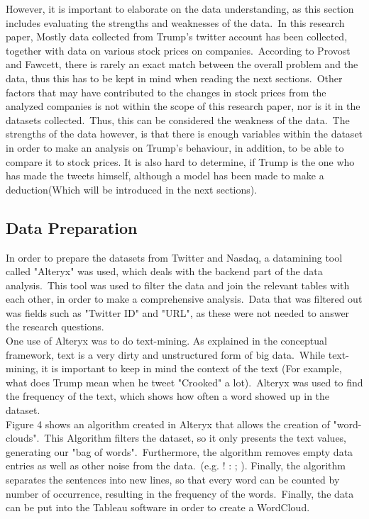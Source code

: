 \documentclass[12pt]{article}
\begin{document}
However, it is important to elaborate on the data understanding, as this section includes evaluating the strengths and weaknesses of the data.\ In this research paper, Mostly data collected from Trump's twitter account has been collected, together with data on various stock prices on companies.\  According to Provost and Fawcett, there is rarely an exact match between the overall problem and the data, thus this has to be kept in mind when reading the next sections.\ Other factors that may have contributed to the changes in stock prices from the analyzed companies is not within the scope of this research paper, nor is it in the datasets collected.\ Thus, this can be considered the weakness of the data.\ The strengths of the data however, is that there is enough variables within the dataset in order to make an analysis on Trump's behaviour, in addition, to be able to compare it to stock prices. It is also hard to determine, if Trump is the one who has made the tweets himself, although a model has been made to make a deduction(Which will be introduced in the next sections).

\subsection{Data Preparation}
In order to prepare the datasets from Twitter and Nasdaq, a datamining tool called "Alteryx" was used, which deals with the backend part of the data analysis.\ This tool was used to filter the data and join the relevant tables with each other, in order to make a comprehensive analysis.\ Data that was filtered out was fields such as "Twitter ID" and "URL", as these were not needed to answer the research questions.\ \\

One use of Alteryx was to do text-mining. As explained in the conceptual framework, text is a very dirty and unstructured form of big data.\ While text-mining, it is important to keep in mind the context of the text (For example, what does Trump mean when he tweet "Crooked" a lot).\ Alteryx was used to find the frequency of the text, which shows how often a word showed up in the dataset.  \\

Figure 4 shows an algorithm created in Alteryx that allows the creation of "word-clouds".\ This Algorithm filters the dataset, so it only presents the text values, generating our "bag of words".\ Furthermore, the algorithm removes empty data entries as well as other noise from the data.\ (e.g. ! : ; ). Finally, the algorithm separates the sentences into new lines, so that every word can be counted by number of occurrence, resulting in the frequency of the words.\ Finally, the data can be put into the Tableau software in order to create a WordCloud. \citep{foster}
\end{document}
